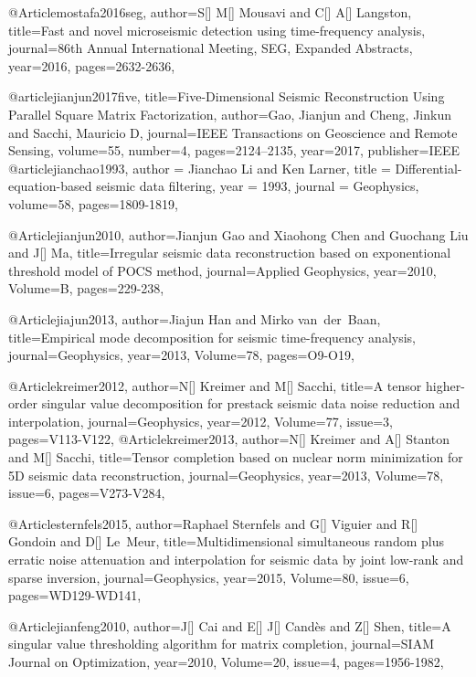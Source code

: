 @Article{mostafa2016seg,
  author={S[] M[] Mousavi and C[] A[] Langston},
  title={Fast and novel microseismic detection using time-frequency analysis},
  journal={86th Annual International Meeting, SEG, Expanded Abstracts},
  year=2016,
  pages={2632-2636},
}

@article{jianjun2017five,
  title={Five-Dimensional Seismic Reconstruction Using Parallel Square Matrix Factorization},
  author={Gao, Jianjun and Cheng, Jinkun and Sacchi, Mauricio D},
  journal={IEEE Transactions on Geoscience and Remote Sensing},
  volume={55},
  number={4},
  pages={2124--2135},
  year={2017},
  publisher={IEEE}
}
@article{jianchao1993,
  author =	 {Jianchao Li and Ken Larner},
  title =	 {Differential-equation-based seismic data filtering},
  year =	 1993,
  journal =	 {Geophysics},
  volume={58},
 pages=1809-1819,
}

@Article{jianjun2010,
  author={Jianjun Gao and Xiaohong Chen and Guochang Liu and J[] Ma},
  title={Irregular seismic data reconstruction based on exponentional threshold model of {POCS} method},
  journal={Applied Geophysics},
  year=2010,
  Volume=B,
  pages={229-238},
}

@Article{jiajun2013,
  author={Jiajun Han and Mirko van~der~Baan},
  title={Empirical mode decomposition for seismic time-frequency analysis},
  journal={Geophysics},
  year=2013,
  Volume=78,
  pages={O9-O19},
}

@Article{kreimer2012,
  author={N[] Kreimer and M[] Sacchi},
  title={A tensor higher-order singular value decomposition for prestack seismic data noise reduction and interpolation},
  journal={Geophysics},
  year=2012,
  Volume=77,
  issue=3,
  pages={V113-V122},
}
@Article{kreimer2013,
  author={N[] Kreimer and A[] Stanton and M[] Sacchi},
  title={Tensor completion based on nuclear norm minimization for 5{D} seismic data reconstruction},
  journal={Geophysics},
  year=2013,
  Volume=78,
  issue=6,
  pages={V273-V284},
}

@Article{sternfels2015,
  author={Raphael Sternfels and G[] Viguier and R[] Gondoin and D[] Le~Meur},
  title={Multidimensional simultaneous random plus erratic noise attenuation and interpolation for seismic data by joint low-rank and sparse inversion},
  journal={Geophysics},
  year=2015,
  Volume=80,
  issue=6,
  pages={WD129-WD141},
}

@Article{jianfeng2010,
  author={J[] Cai and E[] J[] Cand\`{e}s and Z[] Shen},
  title={A singular value thresholding algorithm for matrix completion},
  journal={SIAM Journal on Optimization},
  year=2010,
  Volume=20,
  issue=4,
  pages={1956-1982},
}

